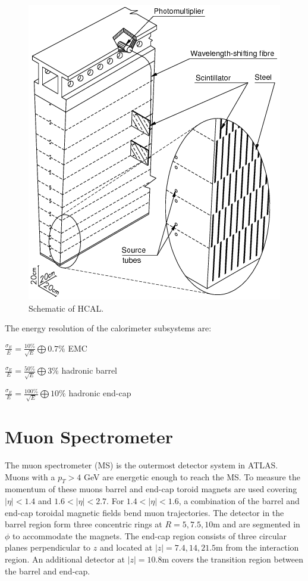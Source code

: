 \begin{figure}[h!]
  \centering
  \includegraphics[width=\hsize]{figures/Detector/hcal.png}
  \caption{Schematic of HCAL.} 
  \label{fig:hcal}
\end{figure}
\FloatBarrier


The energy resolution of the calorimeter subsystems are:

$\frac{\sigma_{E}}{E}=\frac{10\%}{\sqrt{E}}\bigoplus 0.7\%$ EMC

$\frac{\sigma_{E}}{E}=\frac{50\%}{\sqrt{E}}\bigoplus 3\%$ hadronic barrel 

$\frac{\sigma_{E}}{E}=\frac{100\%}{\sqrt{E}}\bigoplus 10\%$ hadronic end-cap


\section{Muon Spectrometer}
The muon spectrometer (MS) is the outermost detector system in ATLAS. Muons with a $p_{T}>4$ GeV are energetic enough to reach the MS. To measure the momentum of these muons barrel and end-cap toroid magnets are used covering $|\eta| < 1.4$ and $1.6<|\eta|<2.7$. For $1.4 < |\eta| < 1.6$, a combination of the barrel and end-cap toroidal magnetic fields bend muon trajectories. The detector in the barrel region form three concentric rings at $R=5, 7.5, 10$m and are segmented in $\phi$ to accommodate the magnets. The end-cap region consists of three circular planes perpendicular to $z$ and located at $|z|=7.4, 14, 21.5$m from the interaction region. An additional detector at $|z|=10.8$m covers the transition region between the barrel and end-cap.


